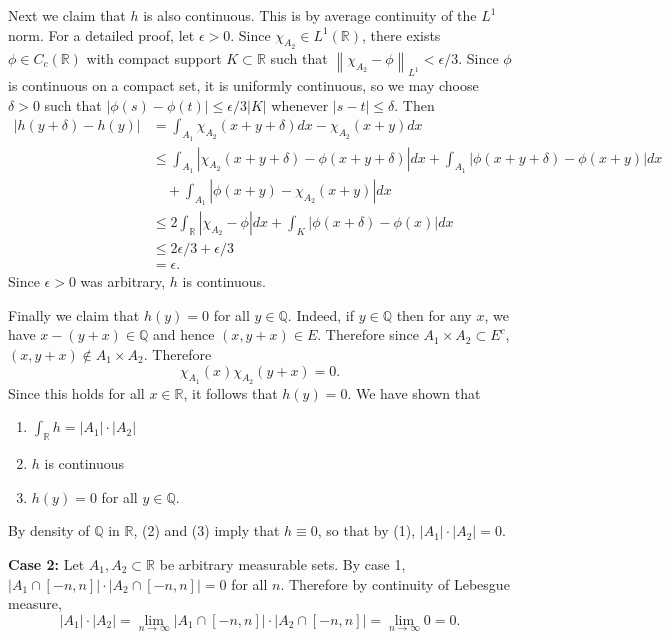 \documentclass{exam}
\theoremstyle{problemstyle}
\newcommand{\norm}[1]{\left\lVert#1\right\rVert} %
\newcommand{\1}[1]{\textbf{1}_{\left[#1\right]}} %
\def\R{\mathbb{R}} %
\def\Q{\mathbb{Q}} %
\begin{document}
\begin{questions}
\begin{solution}
  Next we claim that $h$ is also continuous. This is by average continuity of the $L^{1}$ norm. For a detailed proof, let $\epsilon>0$. Since $\chi_{A_{2}}\in L^{1}(\R)$, there exists $\phi\in C_{c}(\R)$ with compact support $K\subset \R$ such that $\norm{\chi_{A_{2}}-\phi}_{L^{1}}<\epsilon/3$. Since $\phi$ is continuous on a compact set, it is uniformly continuous, so we may choose $\delta>0$ such that $|\phi(s)-\phi(t)|\leq\epsilon/3|K|$ whenever $|s-t|\leq\delta$. Then
  \begin{align*}
    |h(y+\delta)-h(y)|
    &= \int_{A_{1}}\chi_{A_{2}}(x+y+\delta)dx - \chi_{A_{2}}(x+y)dx\\
    &\leq \int_{A_{1}}|\chi_{A_{2}}(x+y+\delta) -\phi(x+y+\delta)|dx +\int_{A_{1}}|\phi(x+y+\delta)-\phi(x+y)|dx\\
    &\quad+\int_{A_{1}}|\phi(x+y) - \chi_{A_{2}}(x+y)|dx\\
    &\leq 2\int_{\R}|\chi_{A_{2}} -\phi|dx +\int_{K}|\phi(x+\delta)-\phi(x)|dx\\
    &\leq 2\epsilon/3 + \epsilon/3\\
    &= \epsilon.
  \end{align*}
  Since $\epsilon>0$ was arbitrary, $h$ is continuous.

  Finally we claim that $h(y)=0$ for all $y\in \Q$. Indeed, if $y\in \Q$ then for any $x$, we have $x-(y+x)\in \Q$ and hence $(x,y+x)\in E$. Therefore since $A_{1}\times A_{2}\subset E^{c}$, $(x,y+x)\notin A_{1}\times A_{2}$. Therefore 
  \begin{equation*}
    \chi_{A_{1}}(x)\chi_{A_{2}}(y+x)=0.
  \end{equation*}
  Since this holds for all $x\in \R$, it follows that $h(y)= 0$.
  We have shown that
  \begin{enumerate}
  \item $\int_{\R} h = |A_{1}|\cdot |A_{2}|$
  \item $h$ is continuous
  \item $h(y) = 0$ for all $y\in \Q$.
  \end{enumerate}
  By density of $\Q$ in $\R$, (2) and (3) imply that $h\equiv 0$, so that by (1), $|A_{1}|\cdot |A_{2}| = 0$.

  \textbf{Case 2:} Let $A_{1},A_{2}\subset \R$ be arbitrary measurable sets. By case 1,  $|A_{1}\cap [-n,n]|\cdot |A_{2}\cap [-n,n]| =0$ for all $n$. Therefore by continuity of Lebesgue measure,
  \begin{equation*}
    |A_{1}|\cdot|A_{2}| = \lim_{n\to\infty}|A_{1}\cap [-n,n]|\cdot |A_{2}\cap [-n,n]| =\lim_{n\to\infty}0=0.
  \end{equation*}
\end{solution}







\end{questions}
\end{document}
